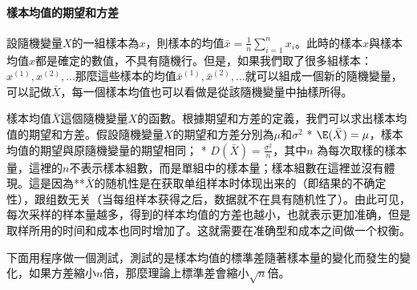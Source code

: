 \documentclass[11pt]{article}
\begin{document}
    \hypertarget{ux6a23ux672cux5747ux503cux7684ux671fux671bux548cux65b9ux5dee}{%
\paragraph{樣本均值的期望和方差}\label{ux6a23ux672cux5747ux503cux7684ux671fux671bux548cux65b9ux5dee}}

設隨機變量\(X\)的一組樣本為\(x\)，則樣本的均值\(\bar{x} = \frac{1}{n} \displaystyle \sum_{i=1}^{n}x_i\)。此時的樣本\(x\)與樣本均值\(x\)都是確定的數值，不具有隨機行。但是，如果我們取了很多組樣本：\(x^{(1)}, x^{(2)}, ...\)那麼這些樣本的均值\(\bar{x}^{(1)}, \bar{x}^{(2)}, ...\)就可以組成一個新的隨機變量，可以記做\(\bar{X}\)，每一個樣本均值也可以看做是從該隨機變量中抽樣所得。

樣本均值\(\bar{X}\)這個隨機變量\(X\)的函數。根據期望和方差的定義，我們可以求出樣本均值的期望和方差。假設隨機變量\(X\)的期望和方差分別為\(\mu\)和\(\sigma^2\)
* \(\E(\bar{X}) = \mu\)，樣本均值的期望與原隨機變量的期望相同； *
\(D(\bar{X}) = \frac{\sigma^2}{n}\)，其中\(n\)
為每次取樣的樣本量，這裡的\(n\)不表示樣本組數，而是單組中的樣本量；樣本組數在這裡並沒有體現。這是因為**\(\bar{X}\)的随机性是在获取单组样本时体现出来的（即结果的不确定性），跟组数无关（当每组样本获得之后，数据就不在具有随机性了）。由此可见，每次采样的样本量越多，得到的样本均值的方差也越小，也就表示更加准确，但是取样所用的时间和成本也同时增加了。这就需要在准确型和成本之间做一个权衡。


下面用程序做一個測試，測試的是樣本均值的標準差隨著樣本量的變化而發生的變化，如果方差縮小\(n\)倍，那麼理論上標準差會縮小\(\sqrt n\)倍。
\end{document}

